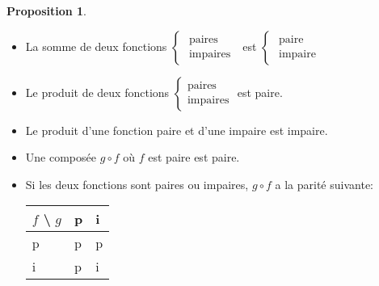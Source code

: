 \documentclass[10pt,a4paper]{article}
\theoremstyle{definition}
\newtheorem{proposition}{Proposition}[section]
\begin{document}
\pagebreak

\begin{proposition}
\hfill
\begin{itemize}
\item La somme de deux fonctions $\begin{cases}
\text{ paires } \\
\text{ impaires }
\end{cases}$ est $\begin{cases}
\text{ paire } \\
\text{ impaire }
\end{cases}$
\item Le produit de deux fonctions $\begin{cases}
\text{paires} \\
\text{impaires}
\end{cases}$ est paire.
\item Le produit d'une fonction paire et d'une impaire est impaire.
\item Une composée $g \circ f$ où $f$ est paire est paire.
\item Si les deux fonctions sont paires ou impaires, $g \circ f$ a la parité suivante:
\begin{center}
\begin{tabular}{M{3em} | M{3em} | M{3em}}
$f$ \textbackslash  $\,\,g$ & p & i \\
\hline
p & p & p \\
\hline
i & p & i
\end{tabular}
\end{center}
\end{itemize}
\end{proposition}
\end{document}
